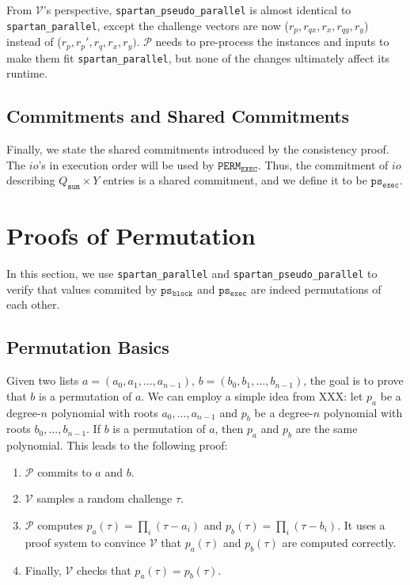 \documentclass{article}
\newcommand{\red}[1] {\color{red}#1\color{black}}
\newcommand{\code}{\texttt}
\newcommand{\Qsum}{Q_{\mathtt{sum}}}
\renewcommand{\P}{\mathcal{P}}
\newcommand{\V}{\mathcal{V}}
\newcommand{\PERME}{\mathtt{PERM_{EXEC}}}
\newcommand{\psb}{\mathtt{ps_{block}}}
\newcommand{\pse}{\mathtt{ps_{exec}}}
\begin{document}
From $\V$'s perspective, \code{spartan\_pseudo\_parallel} is almost identical to \code{spartan\_parallel}, except the challenge vectors are now ($r_p, r_{qx}, r_x, r_{qy}, r_y$) instead of ($r_p, r_p', r_q, r_x, r_y)$. $\P$ needs to pre-process the instances and inputs to make them fit \code{spartan\_parallel}, but none of the changes ultimately affect its runtime.

\subsection{Commitments and Shared Commitments}

Finally, we state the shared commitments introduced by the consistency proof. The $io$'s in execution order will be used by $\PERME$. Thus, the commitment of $io$ describing $\Qsum \times Y$ entries is a shared commitment, and we define it to be $\pse$.


\section{Proofs of Permutation}\label{sec:permutation}

In this section, we use \code{spartan\_parallel} and \code{spartan\_pseudo\_parallel} to verify that values commited by $\psb$ and $\pse$ are indeed permutations of each other.

\subsection{Permutation Basics}

Given two lists $a = (a_0, a_1, ..., a_{n-1})$, $b = (b_0, b_1, ..., b_{n-1})$, the goal is to prove that $b$ is a permutation of $a$. We can employ a simple idea from \red{XXX}: let $p_a$ be a degree-$n$ polynomial with roots $a_0, ..., a_{n-1}$ and $p_b$ be a degree-$n$ polynomial with roots $b_0, ..., b_{n-1}$. If $b$ is a permutation of $a$, then $p_a$ and $p_b$ are the same polynomial. This leads to the following proof:
\begin{enumerate}
    \item $\P$ commits to $a$ and $b$.
    \item $\V$ samples a random challenge $\tau$.
    \item $\P$ computes $p_a(\tau) = \prod_i (\tau - a_i)$ and $p_b(\tau) = \prod_i (\tau - b_i)$. It uses a proof system to convince $\V$ that $p_a(\tau)$ and $p_b(\tau)$ are computed correctly.
    \item Finally, $\V$ checks that $p_a(\tau) = p_b(\tau)$.
\end{enumerate}
\end{document}
